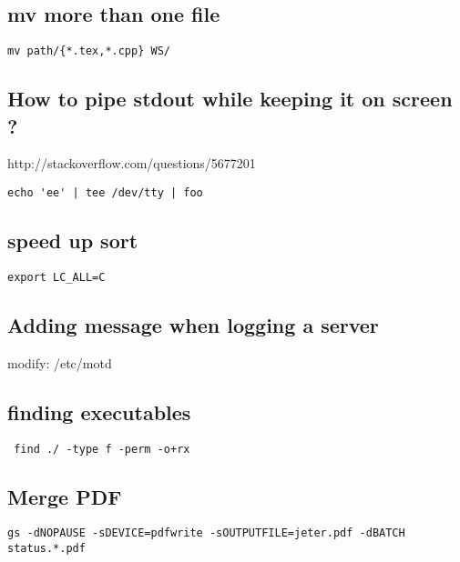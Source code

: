 \documentclass[12pt]{article}
\begin{document}
\subsection{mv more than one file}
\begin{lstlisting}
mv path/{*.tex,*.cpp} WS/
\end{lstlisting}

\subsection{How to pipe stdout while keeping it on screen ?}
http://stackoverflow.com/questions/5677201
\begin{lstlisting}
echo 'ee' | tee /dev/tty | foo
\end{lstlisting}

\subsection{speed up sort}
\begin{lstlisting}
export LC_ALL=C
\end{lstlisting}


\subsection{Adding message when logging a server}
modify: /etc/motd
\subsection{finding executables}
\begin{lstlisting}
 find ./ -type f -perm -o+rx
\end{lstlisting}

\subsection{Merge PDF}
\begin{lstlisting}
gs -dNOPAUSE -sDEVICE=pdfwrite -sOUTPUTFILE=jeter.pdf -dBATCH status.*.pdf
\end{lstlisting}
\end{document}
